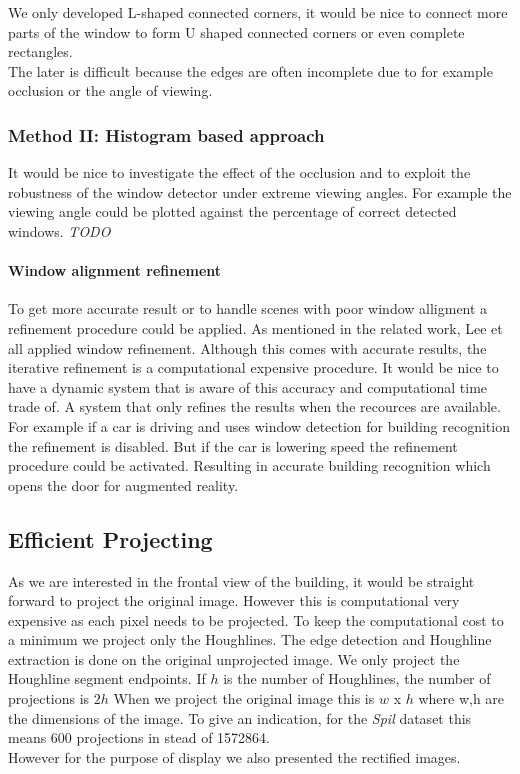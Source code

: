 We only developed L-shaped connected corners, it would be nice to connect more
parts of the window to form U shaped connected corners or even complete rectangles.\\
The later is difficult because the edges are often incomplete due to for example occlusion 
or the angle of viewing.


\subsubsection{Method II: Histogram based approach} 
It would be nice to investigate the effect of the occlusion and to exploit the
robustness of the window detector under extreme viewing angles.
For example the viewing angle could be plotted against the percentage of
correct detected windows.
\emph{TODO}


\paragraph{Window alignment refinement}
To get more accurate result or to handle scenes with poor window alligment a refinement procedure could be applied.
As mentioned in the related work, Lee et all \cite{Lee_extraction} applied window refinement.
Although this comes with accurate results, the iterative refinement is a
computational expensive procedure. 
It would be nice to have a dynamic system that is aware of this 
accuracy and computational time trade of. A system that only refines the results when the recources are available.
For example if a car is driving and uses window detection for building recognition the refinement is disabled.
But if the car is lowering speed the refinement procedure could be activated.
Resulting in accurate building recognition which opens the door for augmented reality.








\subsection{Efficient Projecting} 
As we are interested in the frontal view of the building, it would be straight
forward to project the original image. However this is computational
very expensive as each pixel needs to be projected. To keep the computational cost to a minimum we project only the
Houghlines. The edge detection and Houghline extraction is done on the original
unprojected image. We only project the Houghline segment
endpoints. If $h$ is the number of Houghlines, the number of projections is $2h$
When we project the original image this is $w$ x $h$ where w,h are the dimensions of
the image. To give an indication, for the \emph{Spil} dataset %
this means 600 projections in stead of 1572864.\\
However for the purpose of display we also presented the rectified images.




